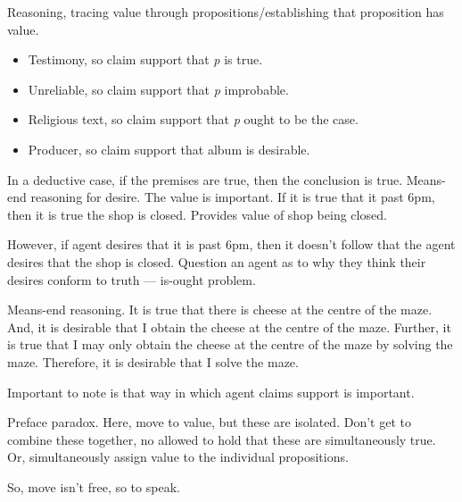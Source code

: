 \begin{note}
  \begin{proposition}\label{prop:RisTV}
    Reasoning, tracing value through propositions/establishing that proposition has value.
  \end{proposition}

  \begin{itemize}
  \item Testimony, so claim support that \emph{p} is true.
  \item Unreliable, so claim support that \emph{p} improbable.
  \item Religious text, so claim support that \emph{p} ought to be the case.
  \item Producer, so claim support that album is desirable.
  \end{itemize}

  In a deductive case, if the premises are true, then the conclusion is true.
  Means-end reasoning for desire.
  The value is important.
  If it is true that it past 6pm, then it is true the shop is closed.
  Provides value of shop being closed.

  However, if agent desires that it is past 6pm, then it doesn't follow that the agent desires that the shop is closed.
  Question an agent as to why they think their desires conform to truth --- is-ought problem.

  Means-end reasoning.
  It is true that there is cheese at the centre of the maze.
  And, it is desirable that I obtain the cheese at the centre of the maze.
  Further, it is true that I may only obtain the cheese at the centre of the maze by solving the maze.
  Therefore, it is desirable that I solve the maze.
\end{note}

\begin{note}
  \color{red}
  Important to note is that way in which agent claims support is important.

  Preface paradox.
  Here, move to value, but these are isolated.
  Don't get to combine these together, no allowed to hold that these are simultaneously true.
  Or, simultaneously assign value to the individual propositions.

  So, move isn't free, so to speak.
\end{note}

